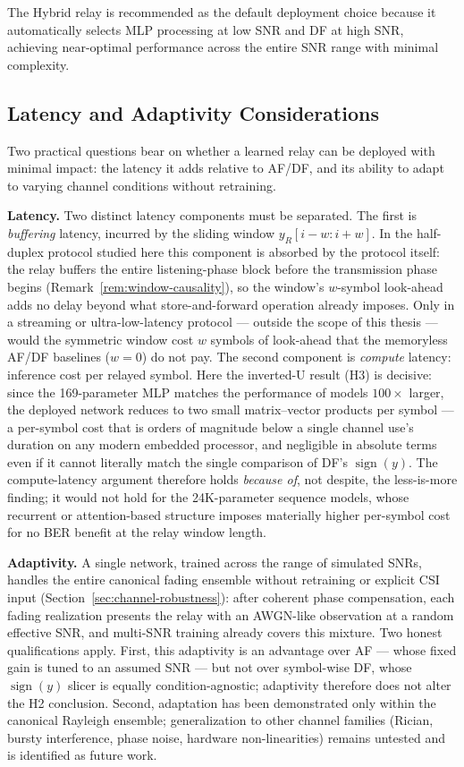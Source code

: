 The Hybrid relay is recommended as the default deployment choice because it automatically selects MLP processing at low SNR and DF at high SNR, achieving near-optimal performance across the entire SNR range with minimal complexity.

\subsection{Latency and Adaptivity Considerations}\label{sec:latency-and-adaptivity-considerations}

Two practical questions bear on whether a learned relay can be deployed with minimal impact: the latency it adds relative to AF/DF, and its ability to adapt to varying channel conditions without retraining.

\textbf{Latency.} Two distinct latency components must be separated. The first is \emph{buffering} latency, incurred by the sliding window $y_R[i-w:i+w]$. In the half-duplex protocol studied here this component is absorbed by the protocol itself: the relay buffers the entire listening-phase block before the transmission phase begins (Remark~\ref{rem:window-causality}), so the window's $w$-symbol look-ahead adds no delay beyond what store-and-forward operation already imposes. Only in a streaming or ultra-low-latency protocol --- outside the scope of this thesis --- would the symmetric window cost $w$ symbols of look-ahead that the memoryless AF/DF baselines ($w=0$) do not pay. The second component is \emph{compute} latency: inference cost per relayed symbol. Here the inverted-U result (H3) is decisive: since the 169-parameter MLP matches the performance of models $100\times$ larger, the deployed network reduces to two small matrix--vector products per symbol --- a per-symbol cost that is orders of magnitude below a single channel use's duration on any modern embedded processor, and negligible in absolute terms even if it cannot literally match the single comparison of DF's $\operatorname{sign}(y)$. The compute-latency argument therefore holds \emph{because of}, not despite, the less-is-more finding; it would not hold for the 24K-parameter sequence models, whose recurrent or attention-based structure imposes materially higher per-symbol cost for no BER benefit at the relay window length.

\textbf{Adaptivity.} A single network, trained across the range of simulated SNRs, handles the entire canonical fading ensemble without retraining or explicit CSI input (Section~\ref{sec:channel-robustness}): after coherent phase compensation, each fading realization presents the relay with an AWGN-like observation at a random effective SNR, and multi-SNR training already covers this mixture. Two honest qualifications apply. First, this adaptivity is an advantage over AF --- whose fixed gain is tuned to an assumed SNR --- but not over symbol-wise DF, whose $\operatorname{sign}(y)$ slicer is equally condition-agnostic; adaptivity therefore does not alter the H2 conclusion. Second, adaptation has been demonstrated only within the canonical Rayleigh ensemble; generalization to other channel families (Rician, bursty interference, phase noise, hardware non-linearities) remains untested and is identified as future work.

